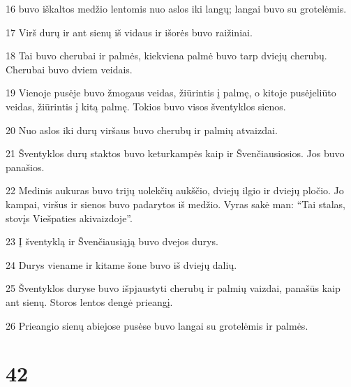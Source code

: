 \par 16 buvo iškaltos medžio lentomis nuo aslos iki langų; langai buvo su grotelėmis. 
\par 17 Virš durų ir ant sienų iš vidaus ir išorės buvo raižiniai. 
\par 18 Tai buvo cherubai ir palmės, kiekviena palmė buvo tarp dviejų cherubų. Cherubai buvo dviem veidais. 
\par 19 Vienoje pusėje buvo žmogaus veidas, žiūrintis į palmę, o kitoje pusėje­liūto veidas, žiūrintis į kitą palmę. Tokios buvo visos šventyklos sienos. 
\par 20 Nuo aslos iki durų viršaus buvo cherubų ir palmių atvaizdai. 
\par 21 Šventyklos durų staktos buvo keturkampės kaip ir Švenčiausiosios. Jos buvo panašios. 
\par 22 Medinis aukuras buvo trijų uolekčių aukščio, dviejų ilgio ir dviejų pločio. Jo kampai, viršus ir sienos buvo padarytos iš medžio. Vyras sakė man: “Tai stalas, stovįs Viešpaties akivaizdoje”. 
\par 23 Į šventyklą ir Švenčiausiąją buvo dvejos durys. 
\par 24 Durys viename ir kitame šone buvo iš dviejų dalių. 
\par 25 Šventyklos duryse buvo išpjaustyti cherubų ir palmių vaizdai, panašūs kaip ant sienų. Storos lentos dengė prieangį. 
\par 26 Prieangio sienų abiejose pusėse buvo langai su grotelėmis ir palmės.



\chapter{42}


